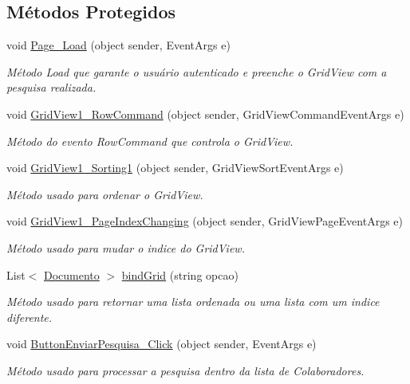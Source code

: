 \subsection*{Métodos Protegidos}
\begin{DoxyCompactItemize}
\item 
void \hyperlink{class_sistema_r_h_1_1_pesquisar_ad812e1cd6c53c94becdff3470d76d5f5}{Page\_\-Load} (object sender, EventArgs e)
\begin{DoxyCompactList}\small\item\em Método Load que garante o usuário autenticado e preenche o GridView com a pesquisa realizada. \item\end{DoxyCompactList}\item 
void \hyperlink{class_sistema_r_h_1_1_pesquisar_a5c8f3da7b34e89252aacb7ec33629c34}{GridView1\_\-RowCommand} (object sender, GridViewCommandEventArgs e)
\begin{DoxyCompactList}\small\item\em Método do evento RowCommand que controla o GridView. \item\end{DoxyCompactList}\item 
void \hyperlink{class_sistema_r_h_1_1_pesquisar_afb80a7522437f0e3556f59a20668b798}{GridView1\_\-Sorting1} (object sender, GridViewSortEventArgs e)
\begin{DoxyCompactList}\small\item\em Método usado para ordenar o GridView. \item\end{DoxyCompactList}\item 
void \hyperlink{class_sistema_r_h_1_1_pesquisar_a9022aa15e787eaae4f2a6c60706c1e39}{GridView1\_\-PageIndexChanging} (object sender, GridViewPageEventArgs e)
\begin{DoxyCompactList}\small\item\em Método usado para mudar o indice do GridView. \item\end{DoxyCompactList}\item 
List$<$ \hyperlink{class_sistema_r_h_1_1_documento}{Documento} $>$ \hyperlink{class_sistema_r_h_1_1_pesquisar_aa43a71ec0dd0944ea937c465ea8af273}{bindGrid} (string opcao)
\begin{DoxyCompactList}\small\item\em Método usado para retornar uma lista ordenada ou uma lista com um indice diferente. \item\end{DoxyCompactList}\item 
void \hyperlink{class_sistema_r_h_1_1_pesquisar_ab03792434165c1bfc547deeee66ad8c9}{ButtonEnviarPesquisa\_\-Click} (object sender, EventArgs e)
\begin{DoxyCompactList}\small\item\em Método usado para processar a pesquisa dentro da lista de Colaboradores. \item\end{DoxyCompactList}\end{DoxyCompactItemize}
